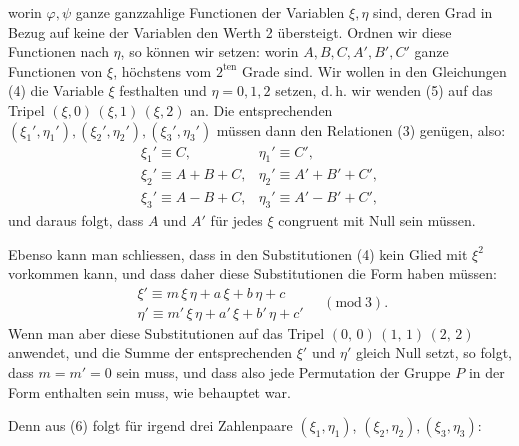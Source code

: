 
worin $\varphi, \psi$ ganze ganzzahlige Functionen der Variablen $\xi, \eta$
sind, deren Grad in Bezug auf keine der Variablen den Werth 2
übersteigt. Ordnen wir diese Functionen nach $\eta$, so können
wir setzen:
worin $A, B, C, A', B', C'$ ganze Functionen von $\xi$, höchstens
vom $2^{\text{ten}}$ Grade sind. Wir wollen in den Gleichungen (4) die
Variable $\xi$ festhalten und $\eta = 0, 1, 2$ setzen, d.\,h. wir wenden
(5) auf das Tripel $(\xi, 0)\,(\xi, 1)\,(\xi, 2)$ an. Die entsprechenden
$(\xi_1', \eta_1'), (\xi_2', \eta_2'), (\xi_3', \eta_3')$ müssen dann den Relationen (3)
genügen, also:
\[
\begin{array}{ll}
\xi_1' \equiv C, & \eta_1' \equiv C',\\
\xi_2' \equiv A + B + C, & \eta_2' \equiv A' + B' + C',\\
\xi_3' \equiv A - B + C, & \eta_3' \equiv A' - B' + C',
\end{array}
\]
und daraus folgt, dass $A$ und $A'$ für jedes $\xi$ congruent mit
Null sein müssen.

Ebenso kann man schliessen, dass in den Substitutionen (4)
kein Glied mit $\xi^2$ vorkommen kann, und dass daher diese Substitutionen
 die Form haben müssen:
\[
\begin{array}{l}
\xi' \equiv m\,\xi\,\eta + a\,\xi + b\,\eta + c\\
\eta' \equiv m'\,\xi\,\eta + a'\,\xi + b'\,\eta + c'
\end{array} \quad (\mathrm{mod}\ 3).
\]
Wenn man aber diese Substitutionen auf das Tripel $(0,\,0)\,(1,\,1)\,(2,\,2)$
anwendet, und die Summe der entsprechenden $\xi'$ und $\eta'$ gleich
Null setzt, so folgt, dass $m = m' = 0$ sein muss, und dass also
jede Permutation der Gruppe $P$ in der Form
enthalten sein muss, wie behauptet war.


Denn aus (6) folgt für irgend drei Zahlenpaare $(\xi_1, \eta_1)$,
$(\xi_2, \eta_2), (\xi_3, \eta_3)$:
